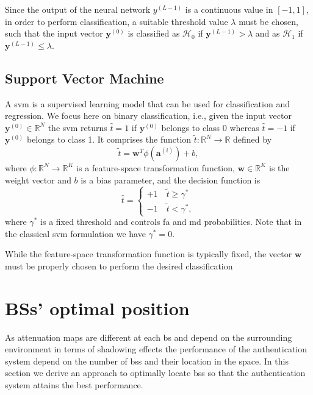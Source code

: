 \documentclass[twocolumns]{IEEEtran}
\begin{document}
Since the output of the neural network $y^{(L-1)}$ is a continuous value in $[-1,1]$, in order to perform classification, a suitable threshold value $\lambda$ must be chosen, such that the input vector $\bm{y}^{(0)}$ is classified as
$\mathcal{H}_0$ if $\bm{y}^{(L-1)} > \lambda$ and as $\mathcal{H}_1$ if $\bm{y}^{(L-1)} \le \lambda$.

\subsection{Support Vector Machine}\label{sec:svm}
A \ac{svm} \cite{Bishop2006} is a supervised learning model that can be used for classification and regression. We focus here on binary classification, i.e., given the input vector $\bm{y}^{(0)} \in \mathbb{R}^N$ the \ac{svm} returns $\hat{t} = 1$ if $\bm{y}^{(0)}$ belongs to class 0 whereas $\hat{t}=-1$ if $\bm{y}^{(0)}$ belongs to class 1. It comprises the function $\tilde{t}: \mathbb{R}^N \to \mathbb{R}$ defined by
\begin{equation}
\label{eq:svm}
\tilde{t} = \mathbf{w}^T \phi (\mathbf{a}^{(i)}) + b,
\end{equation}
where $\phi: \mathbb{R}^N \to \mathbb{R}^K$ is a feature-space transformation function, $\mathbf{w} \in \mathbb{R}^K$ is the weight vector and $b$ is a bias parameter, and the decision function is
\begin{equation}
\label{eq:cases}
\hat{t} = 
\begin{cases}
+1 \quad \tilde{t}  \geq \gamma^* \\
-1 \quad \tilde{t}  < \gamma^*,
\end{cases}		
\end{equation} 
where $\gamma^*$ is a fixed threshold and controls \ac{fa} and \ac{md} probabilities. Note that in the classical \ac{svm} formulation we have $\gamma^* = 0$.

While the feature-space transformation function is typically fixed, the vector $\mathbf{w}$ must be properly chosen to perform the desired classification

\section{BSs' optimal position}\label{sec:bsPos}
As attenuation maps are different at each \ac{bs} and depend on the surrounding environment in terms of shadowing effects the performance of the authentication system depend on the number of \acp{bs} and their location in the space. In this section we derive an approach to optimally locate \acp{bs} so that the authentication system attains the best performance. 
\end{document}
